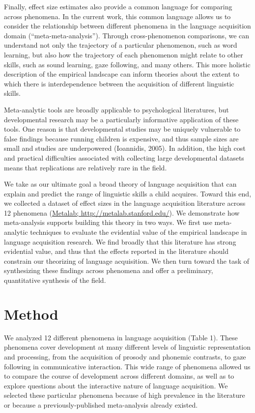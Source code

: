 \documentclass[english,floatsintext,man]{apa6}
\begin{document}
Finally, effect size estimates also provide a common language for
comparing across phenomena. In the current work, this common language
allows us to consider the relationship between different phenomena in
the language acquisition domain (\enquote{meta-meta-analysis}). Through
cross-phenomenon comparisons, we can understand not only the trajectory
of a particular phenomenon, such as word learning, but also how the
trajectory of each phenomenon might relate to other skills, such as
sound learning, gaze following, and many others. This more holistic
description of the empirical landscape can inform theories about the
extent to which there is interdependence between the acquisition of
different linguistic skills.

Meta-analytic tools are broadly applicable to psychological literatures,
but developmental research may be a particularly informative application
of these tools. One reason is that developmental studies may be uniquely
vulnerable to false findings because running children is expensive, and
thus sample sizes are small and studies are underpowered (Ioannidis,
2005). In addition, the high cost and practical difficulties associated
with collecting large developmental datasets means that replications are
relatively rare in the field.

We take as our ultimate goal a broad theory of language acquisition that
can explain and predict the range of linguistic skills a child acquires.
Toward this end, we collected a dataset of effect sizes in the language
acquisition literature across 12 phenomena
(\href{http://metalab.stanford.edu}{Metalab;
http://metalab.stanford.edu/}). We demonstrate how meta-analysis
supports building this theory in two ways. We first use meta-analytic
techniques to evaluate the evidential value of the empirical landscape
in language acquisition research. We find broadly that this literature
has strong evidential value, and thus that the effects reported in the
literature should constrain our theorizing of language acquisition. We
then turn toward the task of synthesizing these findings across
phenomena and offer a preliminary, quantitative synthesis of the field.

\section{Method}\label{method}

We analyzed 12 different phenomena in language acquisition (Table 1).
These phenomena cover development at many different levels of linguistic
representation and processing, from the acquisition of prosody and
phonemic contrasts, to gaze following in communicative interaction. This
wide range of phenomena allowed us to compare the course of development
across different domains, as well as to explore questions about the
interactive nature of language acquisition. We selected these particular
phenomena because of high prevalence in the literature or because a
previously-published meta-analysis already existed.
\end{document}
